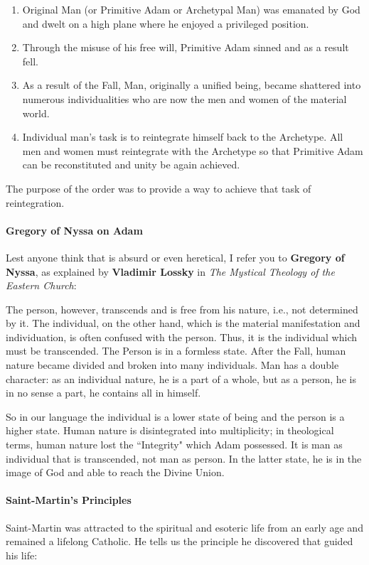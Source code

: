 \begin{enumerate}
\item Original Man (or Primitive Adam or Archetypal Man) was emanated by God and dwelt on a high plane where he enjoyed a privileged position. 
\item Through the misuse of his free will, Primitive Adam sinned and as a result fell. 
\item As a result of the Fall, Man, originally a unified being, became shattered into numerous individualities who are now the men and women of the material world. 
\item Individual man's task is to reintegrate himself back to the Archetype. All men and women must reintegrate with the Archetype so that Primitive Adam can be reconstituted and unity be again achieved. 
\end{enumerate}
The purpose of the order was to provide a way to achieve that task of reintegration.

\paragraph{Gregory of Nyssa on Adam}
Lest anyone think that is absurd or even heretical, I refer you to \textbf{Gregory of Nyssa}, as explained by \textbf{Vladimir Lossky} in \emph{The Mystical Theology of the Eastern Church}:

\begin{quotex}
The person, however, transcends and is free from his nature, i.e., not determined by it. The individual, on the other hand, which is the material manifestation and individuation, is often confused with the person. Thus, it is the individual which must be transcended. The Person is in a formless state. After the Fall, human nature became divided and broken into many individuals. Man has a double character: as an individual nature, he is a part of a whole, but as a person, he is in no sense a part, he contains all in himself. 

\end{quotex}
So in our language the individual is a lower state of being and the person is a higher state. Human nature is disintegrated into multiplicity; in theological terms, human nature lost the ``Integrity" which Adam possessed. It is man as individual that is transcended, not man as person. In the latter state, he is in the image of God and able to reach the Divine Union.

\paragraph{Saint-Martin's Principles}
Saint-Martin was attracted to the spiritual and esoteric life from an early age and remained a lifelong Catholic. He tells us the principle he discovered that guided his life:

